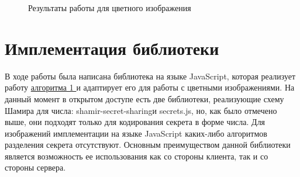 \documentclass[a4paper,article,14pt]{extarticle}
\begin{document}
\begin{figure}[ph!]
\begin{minipage}[h]{0.3\linewidth}
    \end{minipage}
    \hfill
    \begin{minipage}[h]{0.3\linewidth}
    \end{minipage}
    \caption{Результаты работы для цветного изображения}
    \label{fig:experimental_mod}
\end{figure}

\newpage
\section{Имплементация библиотеки}

В ходе работы была написана библиотека на языке JavaScript, которая реализует работу \hyperlink{generation_alg}{алгоритма 1 } и адаптирует его для
работы с цветными изображениями. 
На данный момент в открытом доступе есть две библиотеки, реализующие схему Шамира для числа: \flqq shamir-secret-sharing\frqq и \flqq secrets.js\frqq,
но, как было отмечено выше, они подходят только для кодирования секрета в форме числа. Для изображений
имплементации на языке JavaScript каких-либо алгоритмов разделения секрета отсутствуют.
Основным преимуществом данной библиотеки является возможность ее использования как со стороны клиента, так и со стороны сервера.
\end{document}
